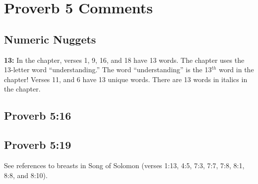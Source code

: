 \section{Proverb 5 Comments}

\subsection{Numeric Nuggets}
\textbf{13:} In the chapter, verses 1, 9, 16, and 18 have 13 words. The chapter uses the 13-letter word ``understanding.'' The word ``understanding'' is the 13$^{th}$ word in the chapter! Verses 11, and 6  have 13 unique words. There are 13 words in italics in the chapter.


\subsection{Proverb 5:16}


\subsection{Proverb 5:19}
See references to breasts in Song of Solomon (verses 1:13, 4:5, 7:3, 7:7, 7:8, 8:1, 8:8, and 8:10). 


